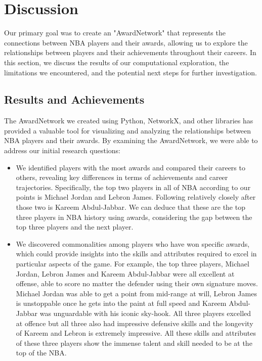 \documentclass[fontsize=11pt]{article}
\begin{document}
\section{Discussion}

Our primary goal was to create an "AwardNetwork" that represents the connections between NBA players and their awards, allowing us to explore the relationships between players and their achievements throughout their careers. In this section, we discuss the results of our computational exploration, the limitations we encountered, and the potential next steps for further investigation.

\subsection{Results and Achievements}

The AwardNetwork we created using Python, NetworkX, and other libraries has provided a valuable tool for visualizing and analyzing the relationships between NBA players and their awards. By examining the AwardNetwork, we were able to address our initial research questions:

\begin{itemize}
\item We identified players with the most awards and compared their careers to others, revealing key differences in terms of achievements and career trajectories. Specifically, the top two players in all of NBA according to our points is Michael Jordan and Lebron James. Following relatively closely after those two is Kareem Abdul-Jabbar. We can deduce that these are the top three players in NBA history using awards, considering the gap between the top three players and the next player.
\item We discovered commonalities among players who have won specific awards, which could provide insights into the skills and attributes required to excel in particular aspects of the game. For example, the top three players, Michael Jordan, Lebron James and Kareem Abdul-Jabbar were all excellent at offense, able to score no matter the defender using their own signature moves. Michael Jordan was able to get a point from mid-range at will, Lebron James is unstoppable once he gets into the paint at full speed and Kareem Abdul-Jabbar was unguardable with his iconic sky-hook. All three players excelled at offence but all three also had impressive defensive skills and the longevity of Kareem and Lebron is extremely impressive. All these skills and attributes of these three players show the immense talent and skill needed to be at the top of the NBA.
\end{itemize}
\end{document}
